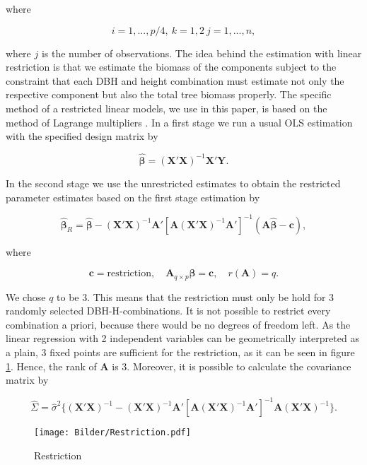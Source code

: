 \documentclass{Vorlage}
\begin{document}
where

$$
i = 1,...,p/4, \: k = 1,2 \: j = 1,...,n,
$$

where $j$ is the number of observations. The idea behind the estimation with linear restriction is that we estimate the biomass of the components subject to the constraint that each DBH and height combination must estimate not only the respective component but also the total tree biomass properly. The specific method of a restricted linear models, we use in this paper, is based on the method of Lagrange multipliers \cite[p. 60]{LR}. In a first stage we run a usual OLS estimation with the specified design matrix by

$$
\hat{\pmb{\beta}} = (\mathbf{X}'\mathbf{X})^{-1}\mathbf{X}'\mathbf{Y}.
$$

In the second stage we use the unrestricted estimates to obtain the restricted parameter estimates based on the first stage estimation by 

$$
\hat{\pmb{\beta}}_R = \hat{\pmb{\beta}} - (\mathbf{X}'\mathbf{X})^{-1}\mathbf{A}'[\mathbf{A}(\mathbf{X}'\mathbf{X})^{-1}\mathbf{A}']^{-1}(\mathbf{A}\hat{\pmb{\beta}} - \mathbf{c}),
$$   

where

$$
\mathbf{c} = \text{restriction}, \quad \mathbf{A}_{q \times p}\pmb{\beta} = \mathbf{c}, \quad r(\mathbf{A}) = q.
$$

We chose $q$ to be 3. This means that the restriction must only be hold for 3 randomly selected DBH-H-combinations. It is not possible to restrict every combination a priori, because there would be no degrees of freedom left. As the linear regression with 2 independent variables can be geometrically interpreted as a plain, 3 fixed points are sufficient for the restriction, as it can be seen in figure \ref{Re}. Hence, the rank of $\mathbf{A}$ is 3.
Moreover, it is possible to calculate the covariance matrix by

$$
\widehat{\Sigma} = \hat{\sigma}^2\{(\mathbf{X}'\mathbf{X})^{-1} - (\mathbf{X}'\mathbf{X})^{-1}\mathbf{A}'[\mathbf{A}(\mathbf{X}'\mathbf{X})^{-1}\mathbf{A}']^{-1}\mathbf{A}(\mathbf{X}'\mathbf{X})^{-1}\}.
$$

\begin{figure}
\center
\texttt{[image: Bilder/Restriction.pdf]}
\caption{Restriction}
\label{Re}
\end{figure}
\end{document}
